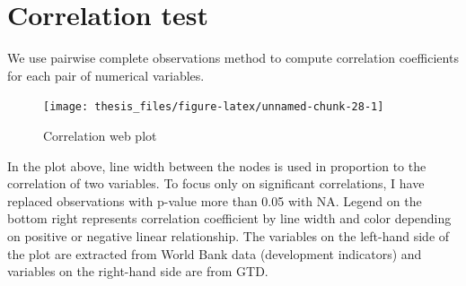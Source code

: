 \documentclass[11pt,oneside,a4paper]{reedthesis}
\newenvironment{Shaded}{\begin{snugshade}}{\end{snugshade}}
\newcommand{\KeywordTok}[1]{\textcolor[rgb]{0.13,0.29,0.53}{\textbf{#1}}}
\newcommand{\DataTypeTok}[1]{\textcolor[rgb]{0.13,0.29,0.53}{#1}}
\newcommand{\DecValTok}[1]{\textcolor[rgb]{0.00,0.00,0.81}{#1}}
\newcommand{\FloatTok}[1]{\textcolor[rgb]{0.00,0.00,0.81}{#1}}
\newcommand{\StringTok}[1]{\textcolor[rgb]{0.31,0.60,0.02}{#1}}
\newcommand{\CommentTok}[1]{\textcolor[rgb]{0.56,0.35,0.01}{\textit{#1}}}
\newcommand{\OtherTok}[1]{\textcolor[rgb]{0.56,0.35,0.01}{#1}}
\newcommand{\ControlFlowTok}[1]{\textcolor[rgb]{0.13,0.29,0.53}{\textbf{#1}}}
\newcommand{\OperatorTok}[1]{\textcolor[rgb]{0.81,0.36,0.00}{\textbf{#1}}}
\newcommand{\NormalTok}[1]{#1}
\begin{document}
\section{Correlation test}\label{correlation-test}

We use pairwise complete observations method to compute correlation
coefficients for each pair of numerical variables.
\begin{Shaded}
\end{Shaded}
\begin{figure}
\texttt{[image: thesis\_files/figure-latex/unnamed-chunk-28-1]} \caption{Correlation web plot}\label{fig:unnamed-chunk-28}
\end{figure}
In the plot above, line width between the nodes is used in proportion to
the correlation of two variables. To focus only on significant
correlations, I have replaced observations with p-value more than 0.05
with NA. Legend on the bottom right represents correlation coefficient
by line width and color depending on positive or negative linear
relationship. The variables on the left-hand side of the plot are
extracted from World Bank data (development indicators) and variables on
the right-hand side are from GTD.
\end{document}
